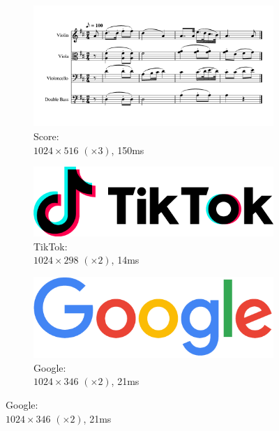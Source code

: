 \documentclass[UTF8]{ctexart}
\begin{document}
\begin{figure}[H]
    \ContinuedFloat
    \centering
    \begin{subfigure}[b]{\textwidth}
        \centering
        \includegraphics[width=\textwidth]{images/Score-1024x516-x3-150ms.png}
        \caption{Score: \\$1024 \times 516$ $(\times 3)$, 150ms}
    \end{subfigure}
    \par\bigskip
    \begin{subfigure}[b]{0.4\textwidth}
        \centering
        \includegraphics[width=\textwidth]{images/TikTok-1024x298-x2-14ms.png}
        \caption{TikTok: \\$1024 \times 298$ $(\times 2)$, 14ms}
    \end{subfigure}
    \hfill
    \begin{subfigure}[b]{0.4\textwidth}
        \centering
        \includegraphics[width=\textwidth]{images/Google-1024x346-x2-21ms.png}
        \caption{Google: \\$1024 \times 346$ $(\times 2)$, 21ms}

\end{subfigure}
\end{figure}
\end{document}
